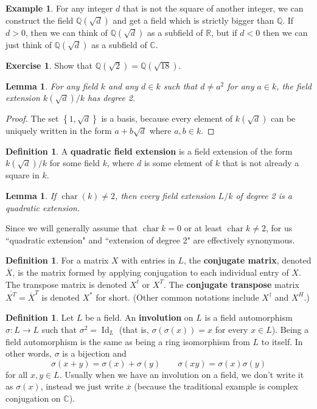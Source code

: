 \documentclass[12pt]{article}
\newtheorem{lemma}[theorem]{Lemma}
\theoremstyle{definition}
\newtheorem{definition}[theorem]{Definition}
\newtheorem{example}[theorem]{Example}
\newtheorem{exercise}[theorem]{Exercise}
\newcommand{\Q}{\mathbb{Q}}
\newcommand{\R}{\mathbb{R}}
\newcommand{\C}{\mathbb{C}}
\newcommand{\sig}{\sigma}
\newcommand{\lp}{\left(}
\newcommand{\rp}{\right)}
\newcommand{\lb}{\left\{}
\newcommand{\rb}{\right\}}
\newcommand{\tbf}{\textbf}
\newcommand{\noi}{\noindent}
\newcommand{\ov}{\overline}
\DeclareMathOperator{\characteristic}{char}
\DeclareMathOperator{\Id}{Id}
\begin{document}
\begin{example}
For any integer $d$ that is not the square of another integer, we can construct the field $\Q \lp \sqrt{d} \rp$ and get a field which is strictly bigger than $\Q$. If $d > 0$, then we can think of $\Q\lp \sqrt{d} \rp$ as a subfield of $\R$, but if $d < 0$ then we can just think of $\Q \lp \sqrt{d} \rp$ as a subfield of $\C$.
\end{example}

\begin{exercise}
Show that $\Q(\sqrt{2}) = \Q(\sqrt{18})$.
\end{exercise}

\begin{lemma}
For any field $k$ and any $d \in k$ such that $d \neq a^2$ for any $a \in k$, the field extension $k \lp \sqrt{d} \rp/k$ has degree 2.
\end{lemma}
\begin{proof}
The set $\lb 1, \sqrt{d} \rb$ is a basis, because every element of $k \lp \sqrt{d} \rp$ can be uniquely written in the form $a + b \sqrt{d}$ where $a, b \in k$.
\end{proof}

\begin{definition}
A \tbf{quadratic field extension} is a field extension of the form $k \lp \sqrt{d} \rp/k$ for some field $k$, where $d$ is some element of $k$ that is not already a square in $k$.
\end{definition}

\begin{lemma}
If $\characteristic(k) \neq 2$, then every field extension $L/k$ of degree 2 is a quadratic extension.
\end{lemma}

\noi Since we will generally assume that $\characteristic k = 0$ or at least $\characteristic k \neq 2$, for us ``quadratic extension" and ``extension of degree 2" are effectively synonymous.

\begin{definition}
For a matrix $X$ with entries in $L$, the \tbf{conjugate matrix}, denoted $\ov X$, is the matrix formed by applying conjugation to each individual entry of $X$. The transpose matrix is denoted $X^t$ or $X^T$. The \tbf{conjugate transpose} matrix $\ov{X^T} = {\ov X}^T$ is denoted $X^*$ for short. (Other common notations include $X^\dagger$ and $X^H$.)
\end{definition}

\begin{definition}
Let $L$ be a field. An \tbf{involution} on $L$ is a field automorphism $\sig:L \to L$ such that $\sig^2 = \Id_L$ (that is, $\sig(\sig(x)) = x$ for every $x \in L$). Being a field automorphism is the same as being a ring isomorphism from $L$ to itself. In other words, $\sig$ is a bijection and
\[
	\sig(x+y) = \sig(x) + \sig(y) \qquad \sig(xy) = \sig(x) \sig(y)
\]
for all $x,y \in L$. Usually when we have an involution on a field, we don't write it as $\sig(x)$, instead we just write $\ov x$ (because the traditional example is complex conjugation on $\C$).
\end{definition}
\end{document}
